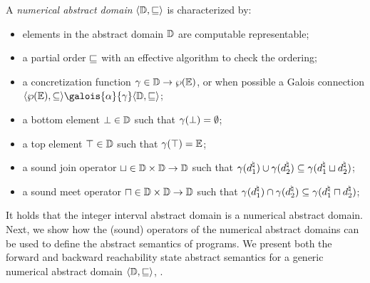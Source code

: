 \begin{definition}
  A \emph{numerical abstract domain} $\langle \mathbb{D}, \sqsubseteq \rangle$ is characterized by:
  \begin{itemize}
    \item elements in the abstract domain $\mathbb{D}$ are computable representable;
    \item a partial order $\sqsubseteq$ with an effective algorithm to check the ordering;
    \item a concretization function $\gamma\in\mathbb{D}\to\wp(\mathbb{E})$, or when possible a Galois connection
    $\tuple{\setof\env}{\subseteq}\galois{\abstractdomainabstraction}{\abstractdomainconcretization}\tuple{\abstractdomain}{\abstractdomainsubseteq}$;
    \item a bottom element $\bot\in\mathbb{D}$ such that $\gamma(\bot) = \emptyset$;
    \item a top element $\top\in\mathbb{D}$ such that $\gamma(\top) = \mathbb{E}$;
    \item a sound join operator $\sqcup\in\mathbb{D}\times\mathbb{D}\to\mathbb{D}$ such that $ \gamma(d^\natural_1) \cup \gamma(d^\natural_2)\subseteq \gamma(d^\natural_1 \sqcup d^\natural_2)$;
    \item a sound meet operator $\sqcap\in\mathbb{D}\times\mathbb{D}\to\mathbb{D}$ such that $\gamma(d^\natural_1) \cap \gamma(d^\natural_2)\subseteq \gamma(d^\natural_1 \sqcap d^\natural_2)$;
  \end{itemize}
\end{definition}

It holds that the integer interval abstract domain is a numerical abstract domain.
Next, we show how the (sound) operators of the numerical abstract domains can be used to define the abstract semantics of programs. We present both the forward and backward reachability state abstract semantics for a generic numerical abstract domain $\langle \mathbb{D}, \sqsubseteq \rangle$, \cf{} .

